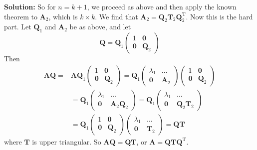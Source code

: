 \documentclass[13pt]{article}
\theoremstyle{definition}
\newenvironment{solution}
{\color{C2}\begin{framed}\begingroup\textbf{Solution:} }
  {\endgroup\end{framed}}
\theoremstyle{remark}
\begin{document}
\begin{solution}
So for $n=k+1$, we proceed as above and then apply the known theorem to $\boldsymbol{A}_2$, which is $k \times k$. We find that $\boldsymbol{A}_2=\boldsymbol{Q}_2 \boldsymbol{T}_2 \boldsymbol{Q}_2^{\mathrm{T}}$. Now this is the hard part. Let $\boldsymbol{Q}_1$ and $\boldsymbol{A}_2$ be as above, and let
$$
\boldsymbol{Q}=\boldsymbol{Q}_1\left(\begin{array}{cc}
1 & \mathbf{0} \\
\mathbf{0} & \boldsymbol{Q}_2
\end{array}\right)
$$
Then
$$
\begin{aligned}
\boldsymbol{A} \boldsymbol{Q}= & \boldsymbol{A} \boldsymbol{Q}_1\left(\begin{array}{cc}
1 & \mathbf{0} \\
\mathbf{0} & \boldsymbol{Q}_2
\end{array}\right)=\boldsymbol{Q}_1\left(\begin{array}{cc}
\lambda_1 & \ldots \\
\mathbf{0} & \boldsymbol{A}_2
\end{array}\right)\left(\begin{array}{cc}
1 & \mathbf{0} \\
\mathbf{0} & \boldsymbol{Q}_2
\end{array}\right) \\
& =\boldsymbol{Q}_1\left(\begin{array}{cc}
\lambda_1 & \ldots \\
\mathbf{0} & \boldsymbol{A}_2 \boldsymbol{Q}_2
\end{array}\right)=\boldsymbol{Q}_1\left(\begin{array}{cc}
\lambda_1 & \ldots \\
\mathbf{0} & \boldsymbol{Q}_2 \boldsymbol{T}_2
\end{array}\right) \\
& =\boldsymbol{Q}_1\left(\begin{array}{cc}
1 & \mathbf{0} \\
\mathbf{0} & \boldsymbol{Q}_2
\end{array}\right)\left(\begin{array}{cc}
\lambda_1 & \ldots \\
\mathbf{0} & \boldsymbol{T}_2
\end{array}\right)=\boldsymbol{Q} \boldsymbol{T}
\end{aligned}
$$
where $\boldsymbol{T}$ is upper triangular. So $\boldsymbol{A} \boldsymbol{Q}=\boldsymbol{Q} \boldsymbol{T}$, or $\boldsymbol{A}=\boldsymbol{Q} \boldsymbol{T} \boldsymbol{Q}^{\mathrm{T}}$.
\end{solution}
\end{document}
